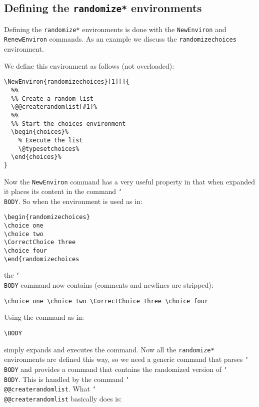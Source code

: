 \documentclass[12pt,a4paper]{exam}
\providecommand{\texorpdfstring}[2]{#1}
\newcommand{\bs}{\texorpdfstring{\char`\\}{}}
\begin{document}
\subsection{Defining the \texttt{randomize*} environments}
Defining the \texttt{randomize*} environments is done with the \texttt{NewEnviron}
and \texttt{RenewEnviron} commands. As an example we discuss the
\texttt{randomizechoices} environment.

We define this environment as follows (not overloaded):

\begin{lstlisting}
\NewEnviron{randomizechoices}[1][]{
  %%
  %% Create a random list
  \@@createrandomlist[#1]%
  %%
  %% Start the choices environment
  \begin{choices}%
    % Execute the list
    \@typesetchoices%
  \end{choices}%
}
\end{lstlisting}

Now the \texttt{NewEnviron} command has a very useful property in that
when expanded it places its content in the command \texttt{\bs BODY}.
So when the environment is used as in:

\begin{lstlisting}
\begin{randomizechoices}
\choice one
\choice two
\CorrectChoice three
\choice four
\end{randomizechoices
\end{lstlisting}

the \texttt{\bs BODY} command now contains (comments and newlines are stripped):

\begin{lstlisting}
\choice one \choice two \CorrectChoice three \choice four
\end{lstlisting}

Using the command as in:
\begin{lstlisting}
\BODY
\end{lstlisting}

simply expands and executes the command. Now all the \texttt{randomize*} environments
are defined this way, so we need a generic command that parses \texttt{\bs BODY} and
provides a command that contains the randomized version of \texttt{\bs BODY}. This is
handled by the command \texttt{\bs @@createrandomlist}. What \texttt{\bs @@createrandomlist}
basically does is:
\end{document}
